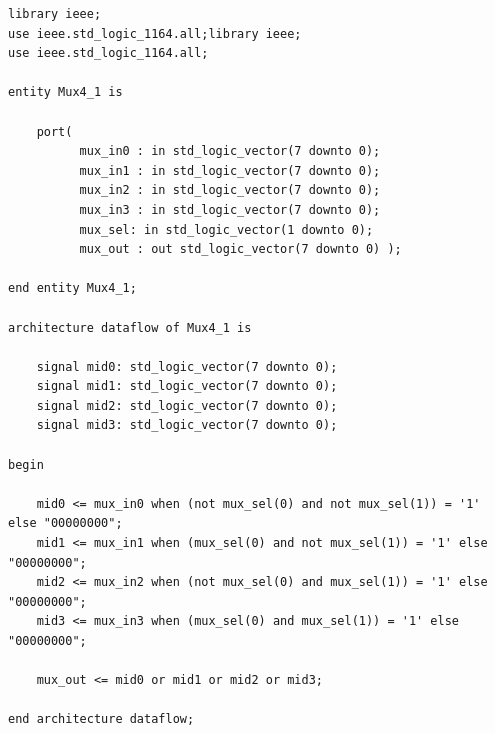 \documentclass[12pt]{article}
\begin{document}
        \begin{verbatim}
library ieee;
use ieee.std_logic_1164.all;library ieee;
use ieee.std_logic_1164.all;

entity Mux4_1 is
	
	port(
          mux_in0 : in std_logic_vector(7 downto 0);
          mux_in1 : in std_logic_vector(7 downto 0);
          mux_in2 : in std_logic_vector(7 downto 0);
          mux_in3 : in std_logic_vector(7 downto 0);
          mux_sel: in std_logic_vector(1 downto 0);
          mux_out : out std_logic_vector(7 downto 0) );

end entity Mux4_1;	

architecture dataflow of Mux4_1 is

	signal mid0: std_logic_vector(7 downto 0);
	signal mid1: std_logic_vector(7 downto 0);
	signal mid2: std_logic_vector(7 downto 0);
	signal mid3: std_logic_vector(7 downto 0);

begin 

	mid0 <= mux_in0 when (not mux_sel(0) and not mux_sel(1)) = '1' else "00000000";
	mid1 <= mux_in1 when (mux_sel(0) and not mux_sel(1)) = '1' else "00000000";
	mid2 <= mux_in2 when (not mux_sel(0) and mux_sel(1)) = '1' else "00000000";
	mid3 <= mux_in3 when (mux_sel(0) and mux_sel(1)) = '1' else "00000000";
	
	mux_out <= mid0 or mid1 or mid2 or mid3;
	
end architecture dataflow;
        \end{verbatim}

\newpage
\end{document}
